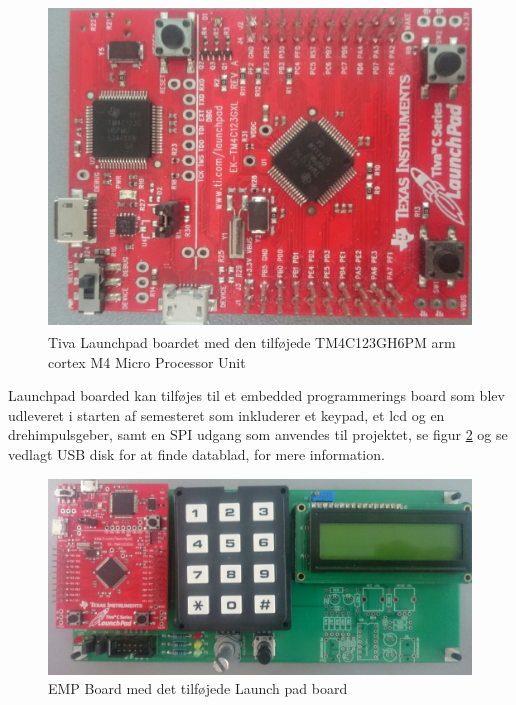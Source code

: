 \begin{figure}[!ht]
	\begin{center}
		\includegraphics[scale=0.08, angle =270]{Billeder/TivaLaunchPad.JPG}
	\end{center}
\caption{Tiva\textsuperscript{\texttrademark} Launchpad boardet med den tilføjede TM4C123GH6PM arm cortex M4 Micro Processor Unit}
\label{fig:TivaLaunchPad}
\end{figure}

Launchpad boarded kan tilføjes til et embedded programmerings board som blev udleveret i starten af semesteret som inkluderer et keypad, et lcd og en drehimpulsgeber, samt en SPI udgang som anvendes til projektet, se figur \ref{fig:EMP_BOARD} og se vedlagt USB disk for at finde datablad, for mere information.

\begin{figure}[!ht]
	\begin{center}
		\includegraphics[scale=0.08, angle =0]{Billeder/EMP_BOARD.JPG}
	\end{center}
\caption{EMP Board med det tilføjede Launch pad board}
\label{fig:EMP_BOARD}
\end{figure}

